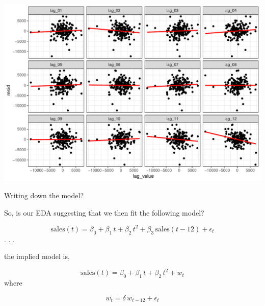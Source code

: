 \documentclass[11pt,ignorenonframetext,]{beamer}
\begin{document}
\begin{frame}{}

\includegraphics{Lec6_files/figure-beamer/unnamed-chunk-19-1.pdf}

\end{frame}

\begin{frame}[t]{Writing down the model?}

So, is our EDA suggesting that we then fit the following model?

\[ \text{sales}(t) = \beta_0 + \beta_1 \, t + \beta_2 \, t^2 + \beta_3 \, \text{sales}(t-12) + \epsilon_t \]
. . .

the implied model is,

\[ \text{sales}(t) = \beta_0 + \beta_1 \, t + \beta_2 \, t^2 + w_t \]
where

\[ w_t = \delta \, w_{t-12} + \epsilon_t \]

\end{frame}
\end{document}
